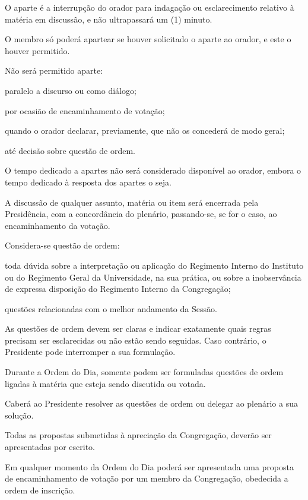 \documentclass{documento}
\begin{document}
\artigo O aparte é a interrupção do orador para indagação ou esclarecimento relativo à matéria em discussão, e não ultrapassará um (1) minuto.

\paragrafo O membro só poderá apartear se houver solicitado o aparte ao orador, e este o houver permitido.

\paragrafo Não será permitido aparte:

\inciso paralelo a discurso ou como diálogo;

\inciso por ocasião de encaminhamento de votação;

\inciso quando o orador declarar, previamente, que não os concederá de modo geral;

\inciso até decisão sobre questão de ordem.

\paragrafo O tempo dedicado a apartes não será considerado disponível ao orador, embora o tempo dedicado à resposta dos apartes o seja.

\artigo A discussão de qualquer assunto, matéria ou item será encerrada pela Presidência, com a concordância do plenário, passando-se, se for o caso, ao encaminhamento da votação.


\artigo Considera-se questão de ordem:

\inciso toda dúvida sobre a interpretação ou aplicação do Regimento Interno do Instituto ou do Regimento Geral da Universidade, na sua prática, ou sobre a inobservância de expressa disposição do Regimento Interno da Congregação;

\inciso questões relacionadas com o melhor andamento da Sessão.

\paragrafo As questões de ordem devem ser claras e indicar exatamente quais regras precisam ser esclarecidas ou não estão sendo seguidas. Caso contrário, o Presidente pode interromper a sua formulação.

\paragrafo Durante a Ordem do Dia, somente podem ser formuladas questões de ordem ligadas à matéria que esteja sendo discutida ou votada.

\paragrafo Caberá ao Presidente resolver as questões de ordem ou delegar ao plenário a sua solução.


\artigo Todas as propostas submetidas à apreciação da Congregação, deverão ser apresentadas por escrito.

\paragrafo Em qualquer momento da Ordem do Dia poderá ser apresentada uma proposta de encaminhamento de votação por um membro da Congregação, obedecida a ordem de inscrição.
\end{document}
